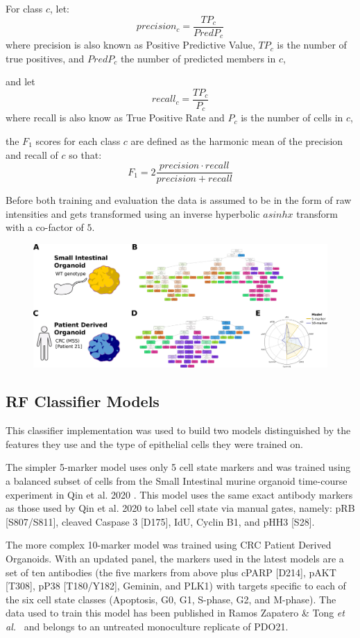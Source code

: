  For class $c$, let:
\[precision_c = \frac{TP_c}{PredP_c}\]
where precision is also known as Positive Predictive Value, $TP_c$ is the number of true positives, and $PredP_c$ the number of predicted members in $c$,

and let
\[recall_c = \frac{TP_c}{P_c}\]
where recall is also know as True Positive Rate and $P_c$ is the number of cells in $c$,

the $F_1$ scores for each class $c$ are defined as the harmonic mean of the precision and recall of $c$ so that:
\[F_1 = 2 \frac{precision \cdot recall}{precision + recall}\]

Before both training and evaluation the data is assumed to be in the form of raw intensities and gets transformed using an inverse hyperbolic \(asinh x\) transform with a co-factor of \(5\). 

\begin{figure}
    \centering
    \includegraphics{02methods/figs/2CYTOF_trainRFclass.png}
    \caption{}
    \label{}
\end{figure}

\subsection{RF Classifier Models}


This classifier implementation was used to build two models distinguished by the features they use and the type of epithelial cells they were trained on. 

The simpler 5-marker model uses only 5 cell state markers and was trained using a balanced subset of cells from the Small Intestinal murine organoid time-course experiment in Qin et al. 2020 \cite{qin_cell-type-specific_2020}. This model uses the same exact antibody markers as those used by Qin et al. 2020 to label cell state via manual gates, namely: pRB [S807/S811], cleaved Caspase 3 [D175], IdU, Cyclin B1, and pHH3 [S28].

The more complex 10-marker model was trained using CRC Patient Derived Organoids. With an updated panel, the markers used in the latest models are a set of ten antibodies (the five markers from above plus cPARP [D214], pAKT [T308], pP38 [T180/Y182], Geminin, and PLK1) with targets specific to each of the six cell state classes (Apoptosis, G0, G1, S-phase, G2, and M-phase). The data used to train this model has been published in Ramos Zapatero \& Tong \emph{et al.}~\cite{zapatero_trellis_2023} and belongs to an untreated monoculture replicate of PDO21. 

